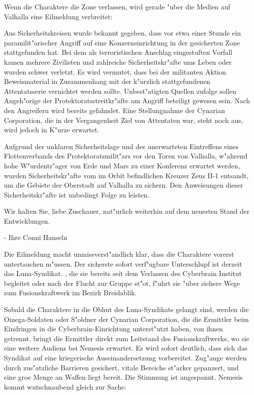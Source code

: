 
Wenn die Charaktere die Zone verlassen, wird gerade "uber die Medien auf Valhalla eine Eilmeldung verbreitet:

\begin{speech}
Aus Sicherheitskreisen wurde bekannt gegeben, dass vor etwa einer Stunde ein paramilit"arischer Angriff auf eine Konzerneinrichtung in der gesicherten Zone stattgefunden hat. Bei dem als terroristischen Anschlag eingestuften Vorfall kamen mehrere Zivilisten und zahlreiche Sicherheitskr"afte ums Leben oder wurden schwer verletzt. Es wird vermutet, dass bei der militanten Aktion Beweismaterial in Zusammenhang mit der k"urzlich stattgefundenen Attentatsserie vernichtet werden sollte. Unbest"atigten Quellen zufolge sollen Angeh"orige der Protektoratsstreitkr"afte am Angriff beteiligt gewesen sein. Nach den Angreifern wird bereits gefahndet. Eine Stellungnahme der Cynarian Corporation, die in der Vergangenheit Ziel von Attentaten war, steht noch aus, wird jedoch in K"urze erwartet.

\nopagebreak
Aufgrund der unklaren Sicherheitslage und des unerwarteten Eintreffens eines Flottenverbands des Protektoratsmilit"ars vor den Toren von Valhalla, w"ahrend hohe W"urdentr"ager von Erde und Mars zu einer Konferenz erwartet werden, wurden Sicherheitskr"afte vom im Orbit befindlichen Kreuzer Zeus II-1 entsandt, um die Gebiete der Oberstadt auf Valhalla zu sichern. Den Anweisungen dieser Sicherheitskr"afte ist unbedingt Folge zu leisten.

\nopagebreak
Wir halten Sie, liebe Zuschauer, nat"urlich weiterhin auf dem neuesten Stand der Entwicklungen.

\nopagebreak
- Ihre Conni Hanseln
\end{speech}

Die Eilmeldung macht unmissverst"andlich klar, dass die Charaktere vorerst untertauchen m"ussen. Der sicherste sofort verf"ugbare Unterschlupf ist derzeit das Luna-Syndikat. \xl{}, die sie bereits seit dem Verlassen des Cyberbrain Institut begleitet oder nach der Flucht zur Gruppe st"o\3t, f"uhrt sie "uber sichere Wege zum Fusionskraftwerk im Bezirk Breidablik.

Sobald die Charaktere in die Obhut des Luna-Syndikats gelangt sind, werden die Omega-Soldaten oder S"oldner der Cynarian Corporation, die die Ermittler beim Eindringen in die Cyberbrain-Einrichtung unterst"utzt haben, von ihnen getrennt. \xl{} bringt die Ermittler direkt zum Leitstand des Fusionskraftwerks, wo sie eine weitere Audienz bei Nemesis erwartet. Es wird sofort deutlich, dass sich das Syndikat auf eine kriegerische Auseinandersetzung vorbereitet. Zug"ange werden durch zus"atzliche Barrieren gesichert, vitale Bereiche st"arker gepanzert, und eine gro\3e Menge an Waffen liegt bereit. Die Stimmung ist angespannt. Nemesis kommt wutschnaubend gleich zur Sache:

